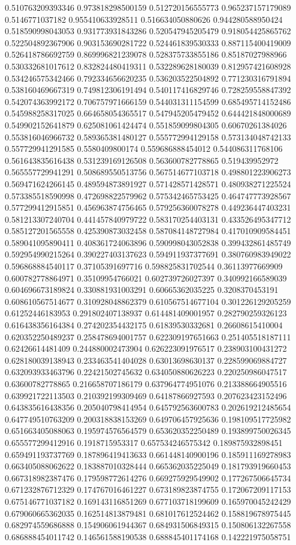 \begin{table}
\begin{tabu}
\begin{sparkline}{10}
0.510763209393346 0.973818298500159 0.512720156555773 0.965237157179089 0.5146771037182 0.955410633928511 0.516634050880626 0.944280588950424 0.518590998043053 0.931773931843286 0.520547945205479 0.918054425865762 0.522504892367906 0.903153690281722 0.524461839530333 0.887115400419009 0.526418786692759 0.869996821239078 0.528375733855186 0.85187027988966 0.530332681017612 0.832824480419311 0.532289628180039 0.812957421608928 0.534246575342466 0.792334656620235 0.536203522504892 0.771230316791894 0.538160469667319 0.749812306191494 0.540117416829746 0.728259558847392 0.542074363992172 0.706757971666159 0.544031311154599 0.685495714152486 0.545988258317025 0.664658054365517 0.547945205479452 0.644421848000689 0.549902152641879 0.625081061424474 0.551859099804305 0.60670261384026 0.553816046966732 0.589365381480127 0.555772994129158 0.573134048742133 0.557729941291585 0.5580409800174 0.559686888454012 0.544086311768106 0.561643835616438 0.531239169126508 0.563600782778865 0.519439952972 0.565557729941291 0.508689550513756 0.567514677103718 0.498801223906273 0.569471624266145 0.489594873891927 0.571428571428571 0.480938271225524 0.573385518590998 0.472698822579962 0.575342465753425 0.464747773928567 0.577299412915851 0.456963874756465 0.579256360078278 0.449236447403231 0.581213307240704 0.441457840979722 0.583170254403131 0.433526495347712 0.585127201565558 0.425390873032458 0.587084148727984 0.417010909584451 0.589041095890411 0.408361724063896 0.590998043052838 0.399432861485749 0.592954990215264 0.390227403137623 0.594911937377691 0.380760983949022 0.596868884540117 0.37105391697716 0.598825831702544 0.36113977669909 0.600782778864971 0.35109954766021 0.602739726027397 0.340992166589039 0.604696673189824 0.330881931003291 0.60665362035225 0.3208370453191 0.608610567514677 0.310928048862379 0.610567514677104 0.301226129205259 0.61252446183953 0.291802407138937 0.614481409001957 0.282790259326123 0.616438356164384 0.274202354432175 0.61839530332681 0.26608615410004 0.620352250489237 0.258478694001757 0.622309197651663 0.251405518187111 0.62426614481409 0.244880002473904 0.626223091976517 0.238903100431272 0.628180039138943 0.233463541404028 0.63013698630137 0.228599069884727 0.632093933463796 0.22421502745632 0.634050880626223 0.220250986047517 0.63600782778865 0.216658707186179 0.637964774951076 0.213388664905516 0.639921722113503 0.210392199309469 0.64187866927593 0.207623423152496 0.643835616438356 0.205040798414954 0.645792563600783 0.202619212485654 0.647749510763209 0.200318838153269 0.649706457925636 0.198109517725982 0.651663405088063 0.195974576564579 0.653620352250489 0.193899750026345 0.655577299412916 0.1918715953317 0.657534246575342 0.189875932898451 0.659491193737769 0.187896419413633 0.661448140900196 0.185911169278983 0.663405088062622 0.183887010328444 0.665362035225049 0.181793919660453 0.667318982387476 0.179598772614276 0.669275929549902 0.177267506645734 0.671232876712329 0.174767016461227 0.673189823874755 0.172067209117153 0.675146771037182 0.169143116851269 0.677103718199609 0.165970045242429 0.679060665362035 0.162514813879481 0.681017612524462 0.158819678975445 0.682974559686888 0.154906061944367 0.684931506849315 0.150806132267558 0.686888454011742 0.146561588190538 0.688845401174168 0.142221975058751 
\end{sparkline}
\end{tabu}
\end{table}
